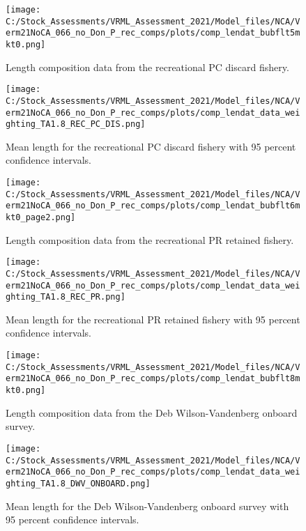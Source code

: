 \documentclass[11pt,
  english,
  a4paper,
]{article}
\begin{document}
\begin{figure}
\centering
\texttt{[image: C:/Stock\_Assessments/VRML\_Assessment\_2021/Model\_files/NCA/Verm21NoCA\_066\_no\_Don\_P\_rec\_comps/plots/comp\_lendat\_bubflt5mkt0.png]}
\caption{Length composition data from the recreational PC discard fishery.\label{fig:len-data-REC-PC-DIS}}
\end{figure}

\begin{figure}
\centering
\texttt{[image: C:/Stock\_Assessments/VRML\_Assessment\_2021/Model\_files/NCA/Verm21NoCA\_066\_no\_Don\_P\_rec\_comps/plots/comp\_lendat\_data\_weighting\_TA1.8\_REC\_PC\_DIS.png]}
\caption{Mean length for the recreational PC discard fishery with 95 percent confidence intervals.\label{fig:mean-com-len-data-REC-PC-DIS}}
\end{figure}

\begin{figure}
\centering
\texttt{[image: C:/Stock\_Assessments/VRML\_Assessment\_2021/Model\_files/NCA/Verm21NoCA\_066\_no\_Don\_P\_rec\_comps/plots/comp\_lendat\_bubflt6mkt0\_page2.png]}
\caption{Length composition data from the recreational PR retained fishery.\label{fig:len-data-REC-PR}}
\end{figure}

\begin{figure}
\centering
\texttt{[image: C:/Stock\_Assessments/VRML\_Assessment\_2021/Model\_files/NCA/Verm21NoCA\_066\_no\_Don\_P\_rec\_comps/plots/comp\_lendat\_data\_weighting\_TA1.8\_REC\_PR.png]}
\caption{Mean length for the recreational PR retained fishery with 95 percent confidence intervals.\label{fig:mean-com-len-data-REC-PR}}
\end{figure}

\begin{figure}
\centering
\texttt{[image: C:/Stock\_Assessments/VRML\_Assessment\_2021/Model\_files/NCA/Verm21NoCA\_066\_no\_Don\_P\_rec\_comps/plots/comp\_lendat\_bubflt8mkt0.png]}
\caption{Length composition data from the Deb Wilson-Vandenberg onboard survey.\label{fig:len-data-DWV-ONBOARD}}
\end{figure}

\begin{figure}
\centering
\texttt{[image: C:/Stock\_Assessments/VRML\_Assessment\_2021/Model\_files/NCA/Verm21NoCA\_066\_no\_Don\_P\_rec\_comps/plots/comp\_lendat\_data\_weighting\_TA1.8\_DWV\_ONBOARD.png]}
\caption{Mean length for the Deb Wilson-Vandenberg onboard survey with 95 percent confidence intervals.\label{fig:mean-com-len-data-DWV-ONBOARD}}
\end{figure}
\end{document}
